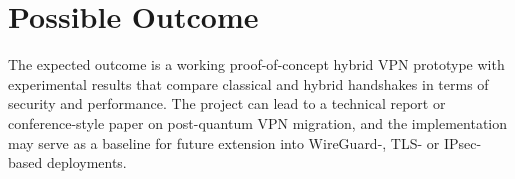\section{Possible Outcome}
The expected outcome is a working proof-of-concept hybrid VPN prototype with
experimental results that compare classical and hybrid handshakes in terms of
security and performance. The project can lead to a technical report or
conference-style paper on post-quantum VPN migration, and the implementation
may serve as a baseline for future extension into WireGuard-, TLS- or
IPsec-based deployments.
